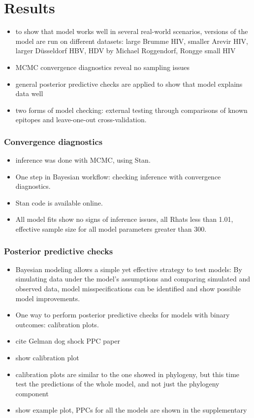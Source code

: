 \documentclass[fleqn,11pt]{SelfArx} %
\begin{document}
\section{Results} \label{sec:results}

\begin{itemize}
  \item to show that model works well in several real-world scenarios, versions of the model are run on different datasets: large Brumme HIV, smaller Arevir HIV, larger Düsseldorf HBV, HDV by Michael Roggendorf, Rongge small HIV
  \item MCMC convergence diagnostics reveal no sampling issues
  \item general posterior predictive checks are applied to show that model explains data well
  \item two forms of model checking: external testing through comparisons of known epitopes and leave-one-out cross-validation.
\end{itemize}

\subsubsection*{Convergence diagnostics}

\begin{itemize}
  \item inference was done with MCMC, using Stan.
  \item One step in Bayesian workflow: checking inference with convergence diagnostics.
  \item Stan code is available online.
  \item All model fits show no signs of inference issues, all Rhats less than 1.01,
    effective sample size for all model parameters greater than 300.
\end{itemize}

\subsubsection*{Posterior predictive checks}

\begin{itemize}
  \item Bayesian modeling allows a simple yet effective strategy to test models: By simulating data under the model's assumptions and comparing simulated and observed data, model misspecifications can be identified and show possible model improvements.
  \item One way to perform posterior predictive checks for models with binary outcomes: calibration plots.
  \item cite Gelman dog shock PPC paper
  \item show calibration plot
  \item calibration plots are similar to the one showed in phylogeny, but this time test the predictions of the whole model, and not just the phylogeny component
  \item show example plot, PPCs for all the models are shown in the supplementary
\end{itemize}
\end{document}
